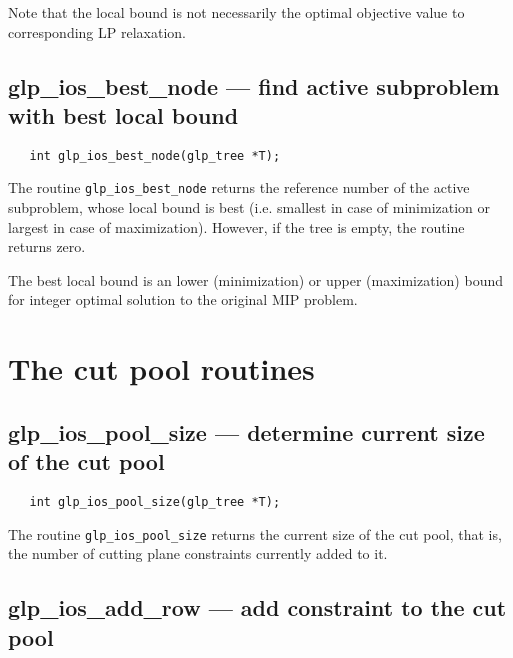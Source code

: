 Note that the local bound is not necessarily the optimal objective
value to corresponding LP relaxation.

\subsection{glp\_ios\_best\_node --- find active subproblem with best
local bound}

\synopsis

\begin{verbatim}
   int glp_ios_best_node(glp_tree *T);
\end{verbatim}

\returns

The routine \verb|glp_ios_best_node| returns the reference number of
the active subproblem, whose local bound is best (i.e. smallest in case
of minimization or largest in case of maximization). However, if the
tree is empty, the routine returns zero.


The best local bound is an lower (minimization) or upper (maximization)
bound for integer optimal solution to the original MIP problem.


\newpage

\section{The cut pool routines}

\subsection{glp\_ios\_pool\_size --- determine current size of the cut
pool}

\synopsis

\begin{verbatim}
   int glp_ios_pool_size(glp_tree *T);
\end{verbatim}

\returns

The routine \verb|glp_ios_pool_size| returns the current size of the
cut pool, that is, the number of cutting plane constraints currently
added to it.

\subsection{glp\_ios\_add\_row --- add constraint to the cut pool}

